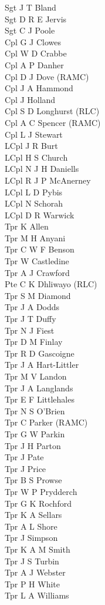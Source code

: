 \begin{multicols}{3}
  \small
  \noindent
  Sgt J T Bland \\
  Sgt D R E Jervis \\
  Sgt C J Poole \\
  Cpl G J Clowes \\
  Cpl W D Crabbe \\
  Cpl A P Danher \\
  Cpl D J Dove (RAMC) \\
  Cpl J A Hammond \\
  Cpl J Holland \\
  Cpl S D Longhurst (RLC) \\
  Cpl A C Spencer (RAMC) \\
  Cpl L J Stewart \\
  LCpl J R Burt \\
  LCpl H S Church \\
  LCpl N J H Daniells \\
  LCpl R J P McAnerney \\
  LCpl L D Pybis \\
  LCpl N Schorah \\
  LCpl D R Warwick \\
  Tpr K Allen \\
  Tpr M H Anyani \\
  Tpr C W F Benson \\
  Tpr W Castledine \\
  Tpr A J Crawford \\
  Pte C K Dhliwayo (RLC) \\
  Tpr S M Diamond \\
  Tpr J A Dodds \\
  Tpr J T Duffy \\
  Tpr N J Fiest \\
  Tpr D M Finlay \\
  Tpr R D Gascoigne \\
  Tpr J A Hart-Littler \\
  Tpr M V Landon \\
  Tpr J A Langlands \\
  Tpr E F Littlehales \\
  Tpr N S O'Brien \\
  Tpr C Parker (RAMC) \\
  Tpr G W Parkin \\
  Tpr J H Parton \\
  Tpr J Pate \\
  Tpr J Price \\
  Tpr B S Prowse \\
  Tpr W P Prydderch \\
  Tpr G K Rochford \\
  Tpr K A Sellars \\
  Tpr A L Shore \\
  Tpr J Simpson \\
  Tpr K A M Smith \\
  Tpr J S Turbin \\
  Tpr A J Webster \\
  Tpr P H White \\
  Tpr L A Williams \\
\end{multicols}

